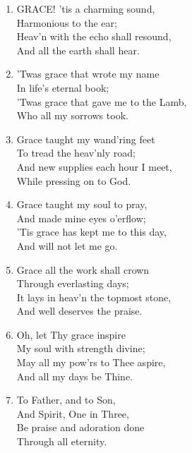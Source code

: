 \documentclass[11pt,a4paper]{article}
\begin{document}
\begin{enumerate}
    \item GRACE! 'tis a charming sound, \\
        Harmonious to the ear; \\
        Heav'n with the echo shall resound, \\
        And all the earth shall hear.

    \item 'Twas grace that wrote my name \\
        In life's eternal book; \\
        'Twas grace that gave me to the Lamb, \\
        Who all my sorrows took.

    \item Grace taught my wand'ring feet \\
        To tread the heav'nly road; \\
        And new supplies each hour I meet, \\
        While pressing on to God.

    \item Grace taught my soul to pray, \\
        And made mine eyes o'erflow; \\
        'Tis grace has kept me to this day, \\
        And will not let me go.

    \item Grace all the work shall crown \\
        Through everlasting days; \\
        It lays in heav'n the topmost stone, \\
        And well deserves the praise.

    \item Oh, let Thy grace inspire \\
        My soul with strength divine; \\
        May all my pow'rs to Thee aspire, \\
        And all my days be Thine.

    \item To Father, and to Son, \\
        And Spirit, One in Three, \\
        Be praise and adoration done \\
        Through all eternity.

\end{enumerate}
\end{document}
